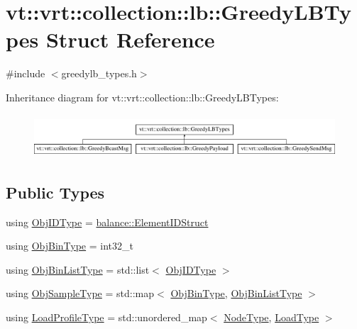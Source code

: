\hypertarget{structvt_1_1vrt_1_1collection_1_1lb_1_1_greedy_l_b_types}{}\section{vt\+:\+:vrt\+:\+:collection\+:\+:lb\+:\+:Greedy\+L\+B\+Types Struct Reference}
\label{structvt_1_1vrt_1_1collection_1_1lb_1_1_greedy_l_b_types}


{\ttfamily \#include $<$greedylb\+\_\+types.\+h$>$}

Inheritance diagram for vt\+:\+:vrt\+:\+:collection\+:\+:lb\+:\+:Greedy\+L\+B\+Types\+:\begin{figure}[H]
\begin{center}
\leavevmode
\includegraphics[height=1.623188cm]{structvt_1_1vrt_1_1collection_1_1lb_1_1_greedy_l_b_types}
\end{center}
\end{figure}
\subsection*{Public Types}
\begin{DoxyCompactItemize}
\item 
using \hyperlink{structvt_1_1vrt_1_1collection_1_1lb_1_1_greedy_l_b_types_ae22670acd689e4ff83315fac2e4acb5e}{Obj\+I\+D\+Type} = \hyperlink{namespacevt_1_1vrt_1_1collection_1_1balance_a9f5b53fafb270212279a4757d2c4cd28}{balance\+::\+Element\+I\+D\+Struct}
\item 
using \hyperlink{structvt_1_1vrt_1_1collection_1_1lb_1_1_greedy_l_b_types_ae0dc433e9afe6112dd0a7ba402e0d6c2}{Obj\+Bin\+Type} = int32\+\_\+t
\item 
using \hyperlink{structvt_1_1vrt_1_1collection_1_1lb_1_1_greedy_l_b_types_a5f1f5da7ec80da0de64a9d91624c396b}{Obj\+Bin\+List\+Type} = std\+::list$<$ \hyperlink{structvt_1_1vrt_1_1collection_1_1lb_1_1_greedy_l_b_types_ae22670acd689e4ff83315fac2e4acb5e}{Obj\+I\+D\+Type} $>$
\item 
using \hyperlink{structvt_1_1vrt_1_1collection_1_1lb_1_1_greedy_l_b_types_a467f8a79d0785fca5fc95bd5c0f406b9}{Obj\+Sample\+Type} = std\+::map$<$ \hyperlink{structvt_1_1vrt_1_1collection_1_1lb_1_1_greedy_l_b_types_ae0dc433e9afe6112dd0a7ba402e0d6c2}{Obj\+Bin\+Type}, \hyperlink{structvt_1_1vrt_1_1collection_1_1lb_1_1_greedy_l_b_types_a5f1f5da7ec80da0de64a9d91624c396b}{Obj\+Bin\+List\+Type} $>$
\item 
using \hyperlink{structvt_1_1vrt_1_1collection_1_1lb_1_1_greedy_l_b_types_a8af324cd88e83727178631e4d1478932}{Load\+Profile\+Type} = std\+::unordered\+\_\+map$<$ \hyperlink{namespacevt_a866da9d0efc19c0a1ce79e9e492f47e2}{Node\+Type}, \hyperlink{namespacevt_a8fb51741340b87d7aaee0bef60e9896b}{Load\+Type} $>$
\end{DoxyCompactItemize}


